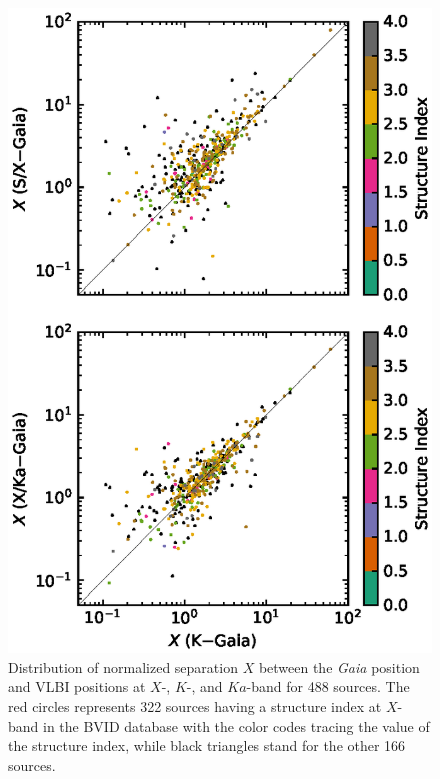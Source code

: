 \documentclass{aa-note}   %
\begin{document}
\begin{figure}[hbtp]
    \centering
    \includegraphics[width=\columnwidth]{figs/X-com-vs-si}
    \caption[]{\label{fig:X-com}
        Distribution of normalized separation $X$ between the {\it Gaia} position and VLBI positions at $X$-, $K$-, and $Ka$-band for 488 sources.
        The red circles represents 322 sources having a structure index at $X$-band in the BVID database with the color codes tracing the value of the structure index, while black triangles stand for the other 166 sources.
    }
\end{figure}
\end{document}
